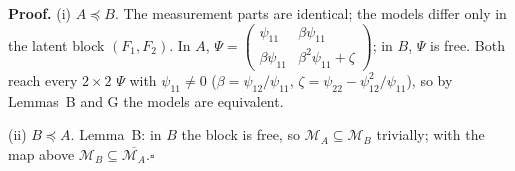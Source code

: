 \documentclass[10pt,a4paper]{article}
\newcommand{\nest}{\preceq}
\begin{document}
\noindent\textbf{Proof.} (i) $A\nest B$. The measurement parts are identical; the models differ only in the latent block $(F_1,F_2)$. In $A$, $\Psi=\begin{pmatrix}\psi_{11}&\beta\psi_{11}\\ \beta\psi_{11}&\beta^2\psi_{11}+\zeta\end{pmatrix}$; in $B$, $\Psi$ is free. Both reach every $2\times2$ $\Psi$ with $\psi_{11}\neq0$ ($\beta=\psi_{12}/\psi_{11}$, $\zeta=\psi_{22}-\psi_{12}^2/\psi_{11}$), so by Lemmas~B and G the models are equivalent.\par\smallskip
\noindent(ii) $B\nest A$. Lemma~B: in $B$ the block is free, so $\mathcal M_A\subseteq\mathcal M_B$ trivially; with the map above $\mathcal M_B\subseteq\overline{\mathcal M_A}$.\hfill$\square$\par\medskip
{}

\clearpage
\end{document}
